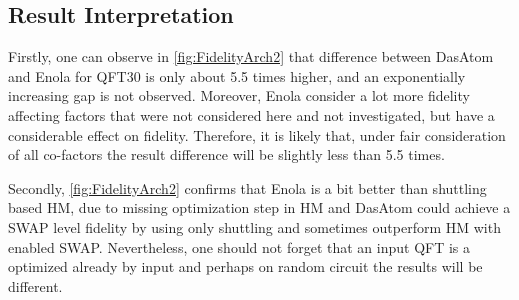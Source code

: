 \subsection{Result Interpretation}
Firstly, one can observe in \ref{fig:FidelityArch2} that difference between DasAtom and Enola for \ac{QFT}30 is only about 5.5 times higher,
and an exponentially increasing gap is not observed.
Moreover, Enola consider a lot more fidelity affecting factors that were not considered here and not investigated, 
but have a considerable effect on fidelity. 
Therefore, it is likely that, under fair consideration of all co-factors the result difference will be slightly less than 5.5 times.

Secondly, \ref{fig:FidelityArch2} confirms that Enola is a bit better than shuttling based \ac{HM}, due to missing optimization step in \ac{HM}
and DasAtom could achieve a SWAP level fidelity by using only shuttling and sometimes outperform \ac{HM} with enabled SWAP.
Nevertheless, one should not forget that an input QFT is a optimized already by input and perhaps on random circuit the results will be different.
